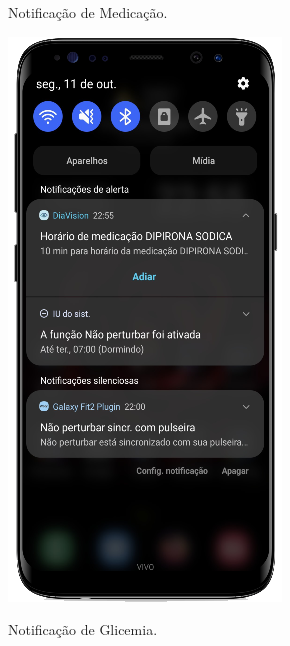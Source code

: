 \begin{figure}[htb]
    \centering
    \begin{minipage}{0.4\textwidth}
        \centering
        \caption{Notificação de Medicação.}\label{fig_app_not_med}
        \includegraphics[scale=0.64]{Imagens/desenvolvimento/app/app_not_med.png}
    \end{minipage}
    \hfill
    \begin{minipage}{0.57\textwidth}
        \centering
        \caption{Notificação de Glicemia.}\label{fig_app_not_gli}

\end{minipage}
\end{figure}

